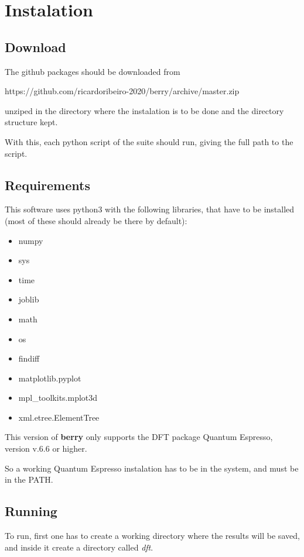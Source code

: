 \documentclass[a4paper,12pt]{report}
\begin{document}
\chapter{Instalation}

\section{Download}
The github packages should be downloaded from\medskip

 https://github.com/ricardoribeiro-2020/berry/archive/master.zip\medskip

unziped in the directory where the instalation is to be done and the directory structure kept.

With this, each python script of the suite should run, giving the full path to the script.

\section{Requirements}

This software uses python3 with the following libraries, that have to be installed
(most of these should already be there by default):
\begin{itemize}
 \item numpy
 \item sys
 \item time
 \item joblib
 \item math
 \item os
 \item findiff
 \item matplotlib.pyplot
 \item mpl\_toolkits.mplot3d
 \item xml.etree.ElementTree
\end{itemize}


This version of \textbf{berry} only supports the DFT package {\sc Quantum Espresso}, version v.6.6 or higher.

So a working {\sc Quantum Espresso} instalation has to be in the system, and must be in the PATH.

\section{Running}\label{sec:running}

 To run, first one has to create a working directory where the results will be saved,
 and inside it create a directory called \emph{dft}.
\end{document}
